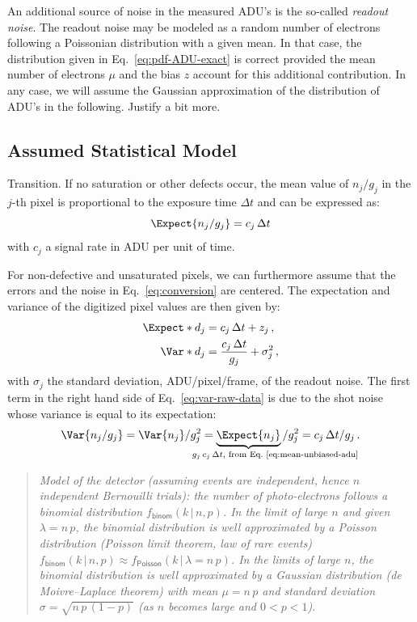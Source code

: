 \documentclass[a4paper,11pt,twoside]{scrartcl}
\newcommand{\oops}[1]{\textcolor[named]{BrickRed}{#1}}
\newcommand*{\given}{\,\vert\,} %
\newcommand*{\Tag}[1]{\mathsf{#1}}
\def\clap#1{\hbox to 0pt{\hss#1\hss}}
\def\mathclap{\mathpalette\mathclapinternal}
\def\mathclapinternal#1#2{\clap{$\mathsurround=0pt#1{#2}$}}
\theoremstyle{plain} %
\theoremstyle{definition}
\theoremstyle{remark}
\newcommand{\note}[1]{\begin{quotation}\emph{#1}\end{quotation}}
\begin{document}
An additional source of noise in the measured ADU's is the so-called
\emph{readout noise}.  The readout noise may be modeled as a random number of
electrons following a Poissonian distribution with a given mean. In that case,
the distribution given in Eq.~\eqref{eq:pdf-ADU-exact} is correct provided the
mean number of electrons $\mu$ and the bias $z$ account for this additional
contribution. In any case, we will assume the Gaussian approximation of the
distribution of ADU's in the following. \oops{Justify a bit more.}


\subsection{Assumed Statistical Model}

\oops{Transition.}
If no saturation or other defects occur, the mean value of $n_j/g_j$ in the
$j$-th pixel is proportional to the exposure time $\Delta t$ and can be
expressed as:
\begin{equation}
  \Expect{n_j/g_j} = c_j\,\Delta t
  \label{eq:mean-unbiased-adu}
\end{equation}
with $c_j$ a signal rate in ADU per unit of time.

For non-defective and unsaturated pixels, we can furthermore assume that the
errors and the noise in Eq.~\eqref{eq:conversion} are centered.  The
expectation and variance of the digitized pixel values are then given by:
\begin{align}
  \Expect*{d_j} &= c_j\,\Delta t + z_j \,,
  \label{eq:avg-raw-data}\\
  \Var*{d_j} &= \frac{c_j\,\Delta t}{g_j} + \sigma_j^2 \, ,
  \label{eq:var-raw-data}
\end{align}
with $\sigma_j$ the standard deviation, ADU/pixel/frame, of the readout noise.
The first term in the right hand side of Eq.~\eqref{eq:var-raw-data} is due to
the shot noise whose variance is equal to its expectation:
\begin{displaymath}
  \Var{n_j/g_j} = \Var{n_j}/g_j^2
  = \underbrace{\Expect{n_j}}_{\mathclap{
      \hspace*{5em}\text{$g_j\,c_j\,\Delta t$, from
      Eq.~\eqref{eq:mean-unbiased-adu}
    }}}/g_j^2
  = c_j\,\Delta t/g_j \, .
\end{displaymath}

\note{Model of the detector (assuming events are independent, hence $n$
  independent Bernouilli trials): the number of photo-electrons follows a
  binomial distribution $f_\Tag{binom}(k \given n, p)$. In the limit of large $n$
  and given $\lambda = n\,p$, the binomial distribution is well approximated by a
  Poisson distribution (Poisson limit theorem, law of rare events)
  $f_\Tag{binom}(k \given n, p) \approx f_\Tag{Poisson}(k \given \lambda =
  n\,p)$.  In the limits of large $n$, the binomial distribution is well
  approximated by a Gaussian distribution (de Moivre--Laplace theorem) with mean
  $\mu = n\,p$ and standard deviation $\sigma = \sqrt{n\,p\,(1 - p)}$ (as $n$
  becomes large and $0 < p < 1$).}
\end{document}
